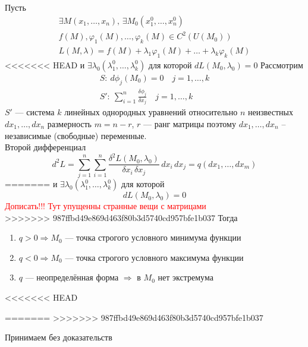 \begin{Th}
    Пусть 
    \begin{gather*}
        \exists M(x_1, \dots, x_n), \, \exists M_0(x^0_1, \dots, x^0_n)\\
        f(M), \varphi_1(M), \dots, \varphi_k(M) \in C^2(U(M_0))\\
        L(M, \lambda) = f(M) + \lambda_1\varphi_1(M) + \dots + \lambda_k\varphi_k(M) 
    \end{gather*}
<<<<<<< HEAD
    и $\exists \lambda_0(\lambda^0_1, \dots, \lambda^0_k)$ для которой $ dL(M_0, \lambda_0) = 0 $ Рассмотрим
    \begin{gather*}
        S:\: d\phi_j(M_0) = 0 \quad j = 1, \dots, k\\
        S':\: \sum_{i=1}^{n} \frac{\delta\phi_j}{\delta x_j} \quad j = 1, \dots, k
    \end{gather*}
    $S'$ --- система $k$ линейных однородных уравнений относительно $n$ неизвестных $dx_1, \dots, dx_n$ размерность $m = n - r$, $r$ --- ранг матрицы поэтому $dx_1, \dots, dx_n$ -- независимые (свободные) переменные.\\
    Второй дифференциал 
    \[
        d^2L = \sum_{j = 1}^{n}\sum_{i = 1}^{n} \frac{\delta^2L(M_0, \lambda_0)}{\delta x_i\, \delta x_j}\, dx_i\, dx_j = q(dx_1, \dots, dx_m)
    \]
=======
    и $\exists \lambda_0(\lambda^0_1, \dots, \lambda^0_k)$ для которой 
    \[
        dL(M_0, \lambda_0) = 0
    \]
    \textcolor{red}{Дописать!!! Тут упущенны странные вещи с матрицами}\\
>>>>>>> 987ffbd49e869d463f80b3d5740cd957bfe1b037
    Тогда
    \begin{enumerate}
        \item $q > 0 \Rightarrow M_0$ --- точка строгого условного минимума функции
        
        \item $q < 0 \Rightarrow M_0$ --- точка строгого условного максимума функции
        
        \item $q$ --- неопределённая форма $\Rightarrow$ в $M_0$ нет экстремума 
    \end{enumerate}
\end{Th}
<<<<<<< HEAD

=======
>>>>>>> 987ffbd49e869d463f80b3d5740cd957bfe1b037
\begin{Proof}
    Принимаем без доказательств
\end{Proof}

